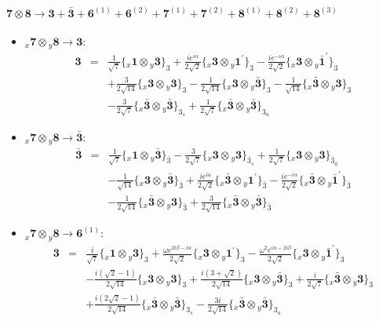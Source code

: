 \documentclass[english]{article}
\newcommand{\rep}[1]{\mathbf{#1}}
\newcommand{\repx}[2]{{}_{#2}\mathbf{#1}}
\newcommand{\subcg}[3]{\big\{ \repx{#1}{x}\otimes\repx{#2}{y}\big\}^{}_{#3}}
\begin{document}
\paragraph*{\Large $\rep{7}\otimes\rep{8}\to\rep{3}+\rep{\bar{3}}+\rep{6}^{(1)}+\rep{6}^{(2)}+\rep{7}^{(1)}+\rep{7}^{(2)}+\rep{8}^{(1)}+\rep{8}^{(2)}+\rep{8}^{(3)}$}
\begin{itemize}
\item $\repx{7}{x}\otimes\repx{8}{y}\to\rep{3}$:
\begin{eqnarray*}
\rep{3} &=& \frac{1}{\sqrt{7}}\subcg{1}{3}{3}+\frac{i e^{i \alpha }}{2 \sqrt{2}}\subcg{3}{1^{\prime}}{3}-\frac{i e^{-i \alpha }}{2 \sqrt{2}}\subcg{3}{\bar{1}^{\prime}}{3} \\ 
 & & +\frac{3}{2 \sqrt{14}}\subcg{3}{3}{3}-\frac{1}{2 \sqrt{14}}\subcg{3}{\bar{3}}{3}-\frac{1}{\sqrt{14}}\subcg{\bar{3}}{3}{3} \\ 
 & & -\frac{3}{2 \sqrt{7}}\subcg{\bar{3}}{\bar{3}}{3_{s}}+\frac{1}{2 \sqrt{7}}\subcg{\bar{3}}{\bar{3}}{3_{a}}
\end{eqnarray*}
\item $\repx{7}{x}\otimes\repx{8}{y}\to\rep{\bar{3}}$:
\begin{eqnarray*}
\rep{\bar{3}} &=& \frac{1}{\sqrt{7}}\subcg{1}{\bar{3}}{\bar{3}}-\frac{3}{2 \sqrt{7}}\subcg{3}{3}{\bar{3}_{s}}+\frac{1}{2 \sqrt{7}}\subcg{3}{3}{\bar{3}_{a}} \\ 
 & & -\frac{1}{\sqrt{14}}\subcg{3}{\bar{3}}{\bar{3}}+\frac{i e^{i \alpha }}{2 \sqrt{2}}\subcg{\bar{3}}{1^{\prime}}{\bar{3}}-\frac{i e^{-i \alpha }}{2 \sqrt{2}}\subcg{\bar{3}}{\bar{1}^{\prime}}{\bar{3}} \\ 
 & & -\frac{1}{2 \sqrt{14}}\subcg{\bar{3}}{3}{\bar{3}}+\frac{3}{2 \sqrt{14}}\subcg{\bar{3}}{\bar{3}}{\bar{3}}
\end{eqnarray*}
\item $\repx{7}{x}\otimes\repx{8}{y}\to\rep{6}^{(1)}$:
\begin{eqnarray*}
\rep{3} &=& \frac{i}{\sqrt{7}}\subcg{1}{3}{3}+\frac{\omega  e^{2 i \beta -i \alpha }}{2 \sqrt{2}}\subcg{3}{1^{\prime}}{3}-\frac{\omega ^2 e^{i \alpha -2 i \beta }}{2 \sqrt{2}}\subcg{3}{\bar{1}^{\prime}}{3} \\ 
 & & -\frac{i \left(\sqrt{2}-1\right)}{2 \sqrt{14}}\subcg{3}{3}{3}+\frac{i \left(3+\sqrt{2}\right)}{2 \sqrt{14}}\subcg{3}{\bar{3}}{3}+\frac{i}{2 \sqrt{7}}\subcg{\bar{3}}{3}{3} \\ 
 & & +\frac{i \left(2 \sqrt{2}-1\right)}{2 \sqrt{14}}\subcg{\bar{3}}{\bar{3}}{3_{s}}-\frac{3 i}{2 \sqrt{14}}\subcg{\bar{3}}{\bar{3}}{3_{a}}

\end{eqnarray*}
\end{itemize}
\end{document}
